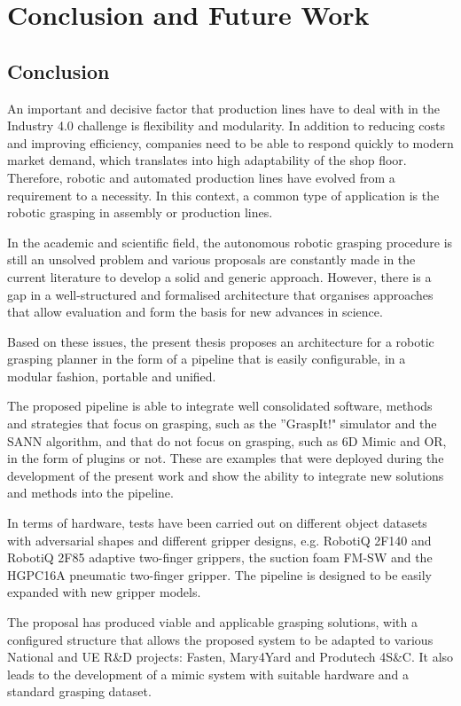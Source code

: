 \chapter{Conclusion and Future Work}
\label{cap6:conclusion}

\section{Conclusion}

An important and decisive factor that production lines have to deal with in the Industry 4.0 challenge is flexibility and modularity. In addition to reducing costs and improving efficiency, companies need to be able to respond quickly to modern market demand, which translates into high adaptability of the shop floor. Therefore, robotic and automated production lines have evolved from a requirement to a necessity. In this context, a common type of application is the robotic grasping in assembly or production lines. 

In the academic and scientific field, the autonomous robotic grasping procedure is still an unsolved problem and various proposals are constantly made in the current literature to develop a solid and generic approach. However, there is a gap in a well-structured and formalised architecture that organises approaches that allow evaluation and form the basis for new advances in science.

Based on these issues, the present thesis proposes an architecture for a robotic grasping planner in the form of a pipeline that is easily configurable, in a modular fashion, portable and unified.

The proposed pipeline is able to integrate well consolidated software, methods and strategies that focus on grasping, such as the ''GraspIt!" simulator and the \ac{SANN} algorithm, and that do not focus on grasping, such as 6D Mimic and OR, in the form of plugins or not. These are examples that were deployed during the development of the present work and show the ability to integrate new solutions and methods into the pipeline.

In terms of hardware, tests have been carried out on different object datasets with adversarial shapes and different gripper designs, e.g. RobotiQ 2F140 and RobotiQ 2F85 adaptive two-finger grippers, the suction foam FM-SW and the HGPC16A pneumatic two-finger gripper. The pipeline is designed to be easily expanded with new gripper models.

The proposal has produced viable and applicable grasping solutions, with a configured structure that allows the proposed system to be adapted to various National and UE R\&D projects: Fasten, Mary4Yard and Produtech 4S\&C. It also leads to the development of a mimic system with suitable hardware and a standard grasping dataset.

